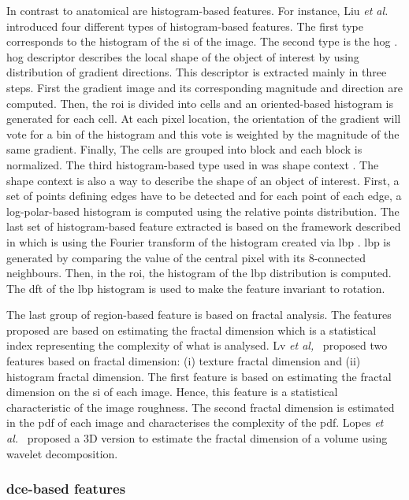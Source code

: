 In contrast to anatomical are histogram-based features.
For instance, Liu \textit{et al.}~\cite{Liu2013} introduced four different types of histogram-based features.
The first type corresponds to the histogram of the \ac{si} of the image.
The second type is the \acf{hog} \cite{Dalal2005}.
\Ac{hog} descriptor describes the local shape of the object of interest by using distribution of gradient directions.
This descriptor is extracted mainly in three steps.
First the gradient image and its corresponding magnitude and direction are computed.
Then, the \ac{roi} is divided into cells and an oriented-based histogram is generated for each cell.
At each pixel location, the orientation of the gradient will vote for a bin of the histogram and this vote is weighted by the magnitude of the same gradient.
Finally, The cells are grouped into block and each block is normalized.
The third histogram-based type used in \cite{Liu2013} was shape context \cite{Belongie2002}.
The shape context is also a way to describe the shape of an object of interest.
First, a set of points defining edges have to be detected and for each point of each edge, a log-polar-based histogram is computed using the relative points distribution.
The last set of histogram-based feature extracted is based on the framework described in \cite{Zhao2012} which is using the Fourier transform of the histogram created via \acf{lbp} \cite{Ojala1996}.
\Ac{lbp} is generated by comparing the value of the central pixel with its 8-connected neighbours.
Then, in the \ac{roi}, the histogram of the \ac{lbp} distribution is computed.
The \acf{dft} of the \ac{lbp} histogram is used to make the feature invariant to rotation.

The last group of region-based feature is based on fractal analysis.
The features proposed are based on estimating the fractal dimension which is a statistical index representing the complexity of what is analysed.
Lv \textit{et al,}~\cite{Lv2009} proposed two features based on fractal dimension: (i) texture fractal dimension and (ii) histogram fractal dimension.
The first feature is based on estimating the fractal dimension on the \ac{si} of each image.
Hence, this feature is a statistical characteristic of the image roughness.
The second fractal dimension is estimated in the \ac{pdf} of each image and characterises the complexity of the \ac{pdf}.
Lopes \textit{et al.}~\cite{Lopes2011} proposed a 3D version to estimate the fractal dimension of a volume using wavelet decomposition.


\subsubsection{\Ac{dce}-based features}\label{subsubsec:chp3:img-clas:CADX-fea-dec:DCE-fea}

